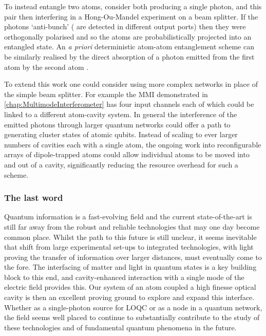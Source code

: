 \documentclass[../Thesis-IJspeert.tex]{subfiles}
\begin{document}
To instead entangle two atoms, consider both producing a single photon, and this pair then interfering in a Hong-Ou-Mandel experiment on a beam splitter.  If the photons `anti-bunch' (\ie{} are detected in different output ports) then they were orthogonally polarised and so the atoms are probabilistically projected into an entangled state.  An \emph{a priori} deterministic atom-atom entanglement scheme can be similarly realised by the direct absorption of a photon emitted from the first atom by the second atom \cite{ritter12}.

To extend this work one could consider using more complex networks in place of the simple beam splitter.  For example the MMI demonstrated in \cref{chap:MultimodeInterferometer} has four input channels each of which could be linked to a different atom-cavity system.  In general the interference of the emitted photons through larger quantum networks could offer a path to generating cluster states of atomic qubits.  Instead of scaling to ever larger numbers of cavities each with a single atom, the ongoing work into reconfigurable arrays of dipole-trapped atoms \cite{stuart14,holland17} could allow individual atoms to be moved into and out of a cavity, significantly reducing the resource overhead for such a scheme. 

\subsubsection*{The last word}

Quantum information is a fast-evolving field and the current state-of-the-art is still far away from the robust and reliable technologies that may one day become common place.  Whilst the path to this future is still unclear, it seems inevitable that shift from large experimental set-ups to integrated technologies, with light proving the transfer of information over larger distances, must eventually come to the fore.  The interfacing of matter and light in quantum states is a key building block to this end, and cavity-enhanced interaction with a single mode of the electric field provides this.  Our system of an atom coupled a high finesse optical cavity is then an excellent proving ground to explore and expand this interface.  Whether as a single-photon source for LOQC or as a node in a quantum network, the field seems well placed to continue to substantially contribute to the study of these technologies and of fundamental quantum phenomena in the future.

\fi
\end{document}

